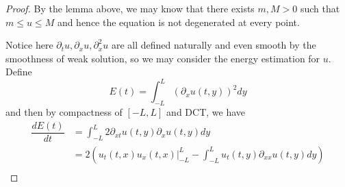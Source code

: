 \begin{proof}
By the lemma above, we may know that there exists $m,M>0$ such that $ m \leq u \leq M$ and hence the equation is not degenerated at every point.\par
Notice here $\partial_t u, \partial_x u,\partial_x^2 u$ are all defined naturally and even smooth by the smoothness of weak solution, so we may consider the energy estimation for $u$. Define
\[
E(t) = \int_{-L}^L (\partial_x u(t,y))^2 dy
\]
and then by compactness of $[-L,L]$ and DCT, we have
\[
\begin{aligned}
    \dfrac{dE(t)}{dt} &= \int_{-L}^L 2\partial_{xt}u(t,y)\partial_x u(t,y) dy\\
    &= 2\left(u_t(t,x)u_x(t,x)|^L_{-L} - \int_{-L}^L u_t(t,y)\partial_{xx}u(t,y)dy\right) \\

\end{aligned}\]
\end{proof}
